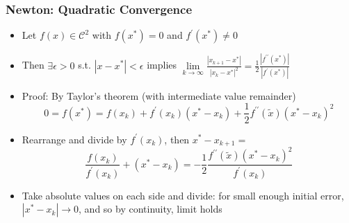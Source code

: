 \documentclass[bigger]{beamer}
\begin{document}
\begin{frame}

\frametitle{Newton: Quadratic Convergence}

\begin{itemize}
\item Let $f(x)\in \mathcal{C}^2$ with $f(x^*)=0$ and $f^{\prime}(x^*)\neq 0$
\item Then $\exists \epsilon>0$ s.t. $\left\vert x-x^* \right\vert<\epsilon$ implies $\underset{k\to\infty}{\lim}\frac{\left\vert x_{k+1}-x^* \right\vert}{\left\vert x_{k}-x^* \right\vert^2}=\frac{1}{2}\frac{\left\vert f^{\prime\prime}(x^*)\right\vert}{\left\vert f^{\prime}(x^*)\right\vert}$

\item Proof: By Taylor's theorem (with intermediate value remainder)
\begin{equation*}
0=f(x^*)=f(x_{k})+f^{\prime}(x_{k})(x^*-x_{k})+\frac{1}{2}f^{\prime\prime}(\tilde{x})(x^*-x_{k})^2
\end{equation*}
\item Rearrange and divide by $f^{\prime}(x_k)$, then $x^*-x_{k+1}=$
\begin{equation*}
\frac{f(x_{k})}{f^{\prime}(x_k)}+(x^*-x_{k})=-\frac{1}{2}\frac{f^{\prime\prime}(\tilde{x})(x^*-x_{k})^2}{f^{\prime}(x_k)}
\end{equation*}
\item Take absolute values on each side and divide: for small enough initial error, $\left\vert x^*-x_{k}\right\vert\to 0$, and so by continuity, limit holds


\end{itemize}


\end{frame}%
\end{document}
